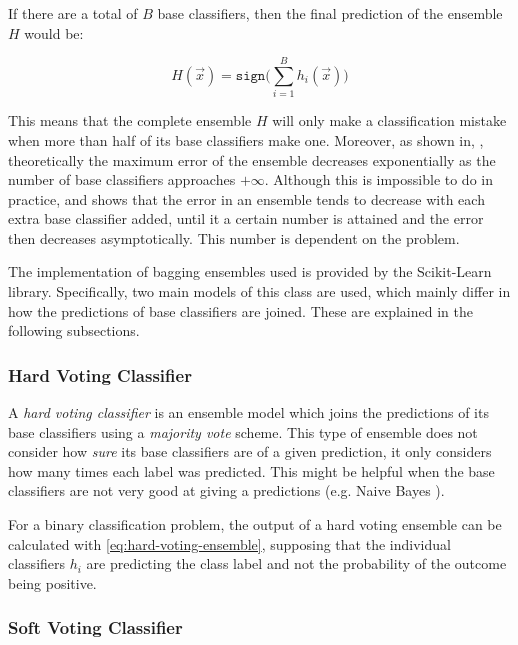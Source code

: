 \documentclass[epsfig,a4paper,11pt,titlepage,twoside,openany]{book}
\begin{document}
If there are a total of $B$ base classifiers, then the final prediction of the ensemble $H$ would be:

\begin{equation}
    H(\vec{x}) = \texttt{sign} \Big( \sum_{i=1}^B h_i (\vec{x}) \Big)
    \label{eq:hard-voting-ensemble}
\end{equation}

This means that the complete ensemble $H$ will only make a classification mistake when more than half of its base classifiers make one. Moreover, as shown in, \cite{zhou2012ensemble}, theoretically the maximum error of the ensemble decreases exponentially as the number of base classifiers approaches $+\infty$. Although this is impossible to do in practice, and \cite{zhou2012ensemble} shows that the error in an ensemble tends to decrease with each extra base classifier added, until it a certain number is attained and the error then decreases asymptotically. This number is dependent on the problem.

The implementation of bagging ensembles used is provided by the Scikit-Learn \cite{scikit-learn} library. Specifically, two main models of this class are used, which mainly differ in how the predictions of base classifiers are joined. These are explained in the following subsections. 


\subsubsection{Hard Voting Classifier}
\label{sec:hard-voting-classifier}

A \textit{hard voting classifier} is an ensemble model which joins the predictions of its base classifiers using a \textit{majority vote} scheme. This type of ensemble does not consider how \textit{sure} its base classifiers are of a given prediction, it only considers how many times each label was predicted. This might be helpful when the base classifiers are not very good at giving a predictions (e.g. Naive Bayes \cite{Domingos1997,scikit-learn}).

For a binary classification problem, the output of a hard voting ensemble can be calculated with \autoref{eq:hard-voting-ensemble}, supposing that the individual classifiers $h_i$ are predicting the class label and not the probability of the outcome being positive.


\subsubsection{Soft Voting Classifier}
\label{sec:soft-voting-classifier}
\end{document}
